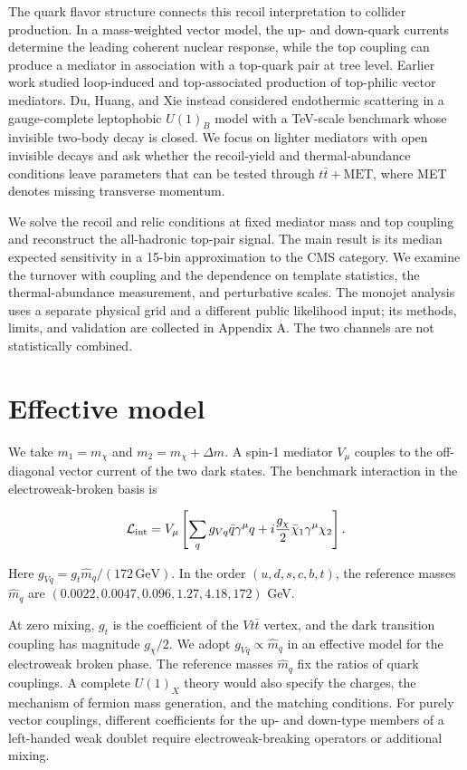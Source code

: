 \documentclass[aps,prd,reprint,superscriptaddress,longbibliography,floatfix]{revtex4-2}
\begin{document}
The quark flavor structure connects this recoil interpretation to collider production. In a mass-weighted vector model, the up- and down-quark currents determine the leading coherent nuclear response, while the top coupling can produce a mediator in association with a top-quark pair at tree level. Earlier work studied loop-induced and top-associated production of top-philic vector mediators. Du, Huang, and Xie instead considered endothermic scattering in a gauge-complete leptophobic $U(1)_B$ model with a TeV-scale benchmark whose invisible two-body decay is closed. We focus on lighter mediators with open invisible decays and ask whether the recoil-yield and thermal-abundance conditions leave parameters that can be tested through $t\bar t+\mathrm{MET}$, where MET denotes missing transverse momentum. \cite{cox2016,du2026}

We solve the recoil and relic conditions at fixed mediator mass and top coupling and reconstruct the all-hadronic top-pair signal. The main result is its median expected sensitivity in a 15-bin approximation to the CMS category. We examine the turnover with coupling and the dependence on template statistics, the thermal-abundance measurement, and perturbative scales. The monojet analysis uses a separate physical grid and a different public likelihood input; its methods, limits, and validation are collected in Appendix A. The two channels are not statistically combined.

\section{Effective model}
\label{sec:model}

We take $m_1=m_\chi$ and $m_2=m_\chi+\Delta m$. A spin-1 mediator
$V_\mu$ couples to the off-diagonal vector current of the two dark
states. The benchmark interaction in the electroweak-broken basis is

\begin{equation}
\label{eq:interaction}
\mathcal L_{\rm int}=V_\mu\left[\sum_q g_{Vq}\bar q\gamma^\mu q
+i\frac{g_\chi}{2}\bar\chi_1\gamma^\mu\chi_2\right].
\end{equation}

Here $g_{Vq}=g_t\widehat m_q/(172\,\mathrm{GeV})$. In the order
$(u,d,s,c,b,t)$, the reference masses $\widehat m_q$ are
$(0.0022,0.0047,0.096,1.27,4.18,172)$ GeV.

At zero mixing, $g_t$ is the coefficient of the $Vt\bar t$ vertex, and
the dark transition coupling has magnitude $g_\chi/2$. We adopt
$g_{Vq}\propto\widehat m_q$ in an effective model for the electroweak
broken phase. The reference masses $\widehat m_q$ fix the ratios of
quark couplings. A complete $U(1)_X$ theory would also specify the
charges, the mechanism of fermion mass generation, and the matching
conditions. For purely vector couplings, different coefficients for the
up- and down-type members of a left-handed weak doublet require
electroweak-breaking operators or additional mixing.
\cite{kahlhoefer2016,deramo2016}
\end{document}
